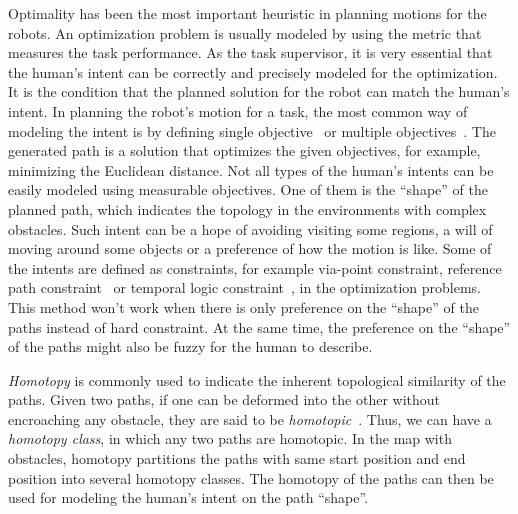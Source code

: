 \documentclass[letterpaper, 10 pt, conference]{ieeeconf}
\begin{document}
Optimality has been the most important heuristic in planning motions for the robots.
An optimization problem is usually modeled by using the metric that measures the task performance.
As the task supervisor, it is very essential that the human's intent can be correctly and precisely modeled for the optimization.
It is the condition that the planned solution for the robot can match the human's intent.
In planning the robot's motion for a task, the most common way of modeling the intent is by defining single objective~\cite{6974170} or multiple objectives~\cite{yi2014supporting}.
The generated path is a solution that optimizes the given objectives, for example, minimizing the Euclidean distance.
Not all types of the human's intents can be easily modeled using measurable objectives.
One of them is the ``shape'' of the planned path, which indicates the topology in the environments with complex obstacles.
Such intent can be a hope of avoiding visiting some regions, a will of moving around some objects or a preference of how the motion is like.
Some of the intents are defined as constraints, for example via-point constraint, reference path constraint~\cite{6974170} or temporal logic constraint~\cite{5650896}, in the optimization problems.
This method won't work when there is only preference on the ``shape'' of the paths instead of hard constraint.
At the same time, the preference on the ``shape'' of the paths might also be fuzzy for the human to describe.

\emph{Homotopy} is commonly used to indicate the inherent topological similarity of the paths.
Given two paths, if one can be deformed into the other without encroaching any obstacle, they are said to be \emph{homotopic}~\cite{Hernandez201544}.
Thus, we can have a \emph{homotopy class}, in which any two paths are homotopic.
In the map with obstacles, homotopy partitions the paths with same start position and end position into several homotopy classes.
The homotopy of the paths can then be used for modeling the human's intent on the path ``shape''. 
\end{document}
